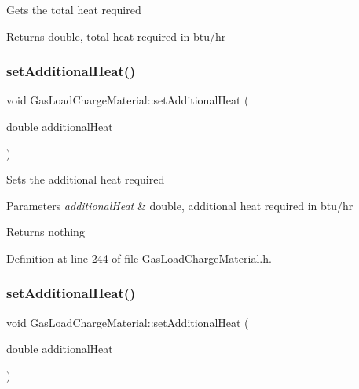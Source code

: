 Gets the total heat required

\begin{DoxyReturn}{Returns}
double, total heat required in btu/hr 
\end{DoxyReturn}
\mbox{\label{class_gas_load_charge_material_a08ef5196ea9919dfc71be6744c7da08e}} 
\subsubsection{\texorpdfstring{set\+Additional\+Heat()}{setAdditionalHeat()}\hspace{0.1cm}{\footnotesize\ttfamily [1/3]}}
{\footnotesize\ttfamily void Gas\+Load\+Charge\+Material\+::set\+Additional\+Heat (\begin{DoxyParamCaption}\item[{double}]{additional\+Heat }\end{DoxyParamCaption})\hspace{0.3cm}{\ttfamily [inline]}}

Sets the additional heat required


\begin{DoxyParams}{Parameters}
{\em additional\+Heat} & double, additional heat required in btu/hr\\
\hline
\end{DoxyParams}
\begin{DoxyReturn}{Returns}
nothing 
\end{DoxyReturn}


Definition at line 244 of file Gas\+Load\+Charge\+Material.\+h.

\mbox{\label{class_gas_load_charge_material_a08ef5196ea9919dfc71be6744c7da08e}} 
\subsubsection{\texorpdfstring{set\+Additional\+Heat()}{setAdditionalHeat()}\hspace{0.1cm}{\footnotesize\ttfamily [2/3]}}
{\footnotesize\ttfamily void Gas\+Load\+Charge\+Material\+::set\+Additional\+Heat (\begin{DoxyParamCaption}\item[{double}]{additional\+Heat }\end{DoxyParamCaption})\hspace{0.3cm}{\ttfamily [inline]}}

